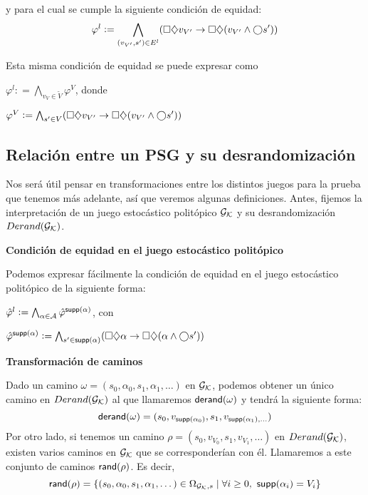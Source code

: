 y para el cual se cumple la siguiente condición de equidad: $$ \varphi^l :=
	\bigwedge_{(v_{V'},s') \in E^l} (\square \diamondsuit v_{V'} \rightarrow \square \diamondsuit
	(v_{V'} \wedge \bigcirc s' )) $$

Esta misma condición de equidad se puede expresar como

\begin{center}
	$ \varphi^l : = \bigwedge_{v_V \in \tilde V} \varphi^V $, donde

	$ \varphi^V := \bigwedge_{s' \in V} (\square \diamondsuit v_{V'} \rightarrow \square \diamondsuit (v_{V'} \wedge \bigcirc s' ))$
\end{center}

\subsection*{Relación entre un PSG y su desrandomización}

Nos será útil pensar en transformaciones entre los distintos juegos para la
prueba que tenemos más adelante, así que veremos algunas definiciones. Antes,
fijemos la interpretación de un juego estocástico politópico $\mathcal{G}_{\mathcal{K}}$ y su
desrandomización $Derand(\mathcal{G}_{\mathcal{K}})$.

\textbf{Condición de equidad en el juego estocástico politópico}

Podemos expresar fácilmente la condición de equidad en el juego estocástico
politópico de la siguiente forma:

\begin{center}
	$
		\hat \varphi^l := \bigwedge_{\alpha \in \mathcal{A}} \hat \varphi^{\textsf{supp}(\alpha)}
	$, con

	$
		\hat \varphi^{\textsf{supp}(\alpha)} := \bigwedge_{s' \in \textsf{supp}(\alpha)} (\square \diamondsuit \alpha \rightarrow \square \diamondsuit (\alpha \wedge \bigcirc s' ))
	$
\end{center}

\textbf{Transformación de caminos}

Dado un camino $\omega = (s_0, \alpha_0, s_1, \alpha_1, \dots)$ en $\mathcal{G}_{\mathcal{K}}$,
podemos obtener un único camino en $Derand(\mathcal{G}_{\mathcal{K}})$ al que llamaremos $\textsf{derand}(\omega)$ y
tendrá la siguiente forma: $$\textsf{derand}(\omega) = (s_0, v_{\textsf{supp}(\alpha_0)}, s_1,
	v_{\textsf{supp}(\alpha_1), \dots})$$ Por otro lado, si tenemos un camino $\rho = (s_0,
	v_{V_0}, s_1, v_{V_1}, \dots)$ en $Derand(\mathcal{G}_{\mathcal{K}})$, existen varios caminos en $\mathcal{G}_{\mathcal{K}}$ que
se corresponderían con él. Llamaremos a este conjunto de caminos $\textsf{rand}(\rho)$.
Es decir, $$\textsf{rand}(\rho) = \{(s_0, \alpha_0, s_1, \alpha_1, \dots) \in
	\Omega_{\mathcal{G}_{\mathcal{K}},s} \mid \forall i \geq 0, \ \textsf{supp}(\alpha_i) = V_i\}$$

